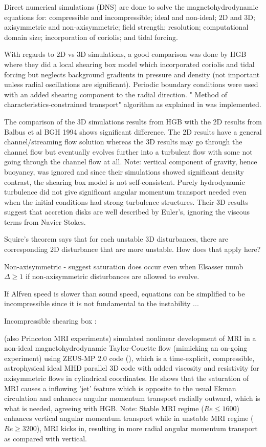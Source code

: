 \documentclass{jfm}
\begin{document}
Direct numerical simulations (DNS) are done to solve the magnetohydrodynamic 
equations for: compressible and incompressible; ideal and non-ideal; 2D and 3D;
axisymmetric and non-axisymmetric; field strength; resolution; computational 
domain size; incorporation of coriolis; and tidal forcing.

With regards to 2D vs 3D simulations, a good comparison was done by 
\cite{Hawley1995} HGB where they did a local shearing box model which 
incorporated coriolis and tidal forcing but neglects background gradients in 
pressure and density (not important unless radial oscillations are 
significant). Periodic boundary conditions were used with an added shearing 
component to the radial direction. " Method of characteristics-constrained 
transport" algorithm as explained in \cite{Hawley1995} was implemented.

The comparison of the 3D simulations results from HGB with the 2D results 
from Balbus et al BGH 1994 shows significant difference. The 2D results have
a general channel/streaming flow solution whereas the 3D results may go through
the channel flow but eventually evolves further into a turbulent flow with some
not going through the channel flow at all. Note: vertical component of gravity,
hence buoyancy, was  ignored and since their simulations showed significant 
density contrast, the shearing box model is not self-consistent. Purely 
hydrodynamic turbulence did not give significant angular momentum transport 
needed even when the initial conditions had strong turbulence structures. 
Their 3D results suggest that accretion disks are well described by Euler's, 
ignoring the viscous terms from Navier Stokes.

Squire's theorem says that for each unstable 3D disturbances, there are 
corresponding 2D disturbance that are more unstable. How does that apply here?

Non-axisymmetric \cite{Fleming2000} - suggest saturation does occur even when 
Elsasser numb $\Delta \ge 1$ if non-axisymmetric disturbances are allowed to 
evolve.

If Alfven speed is slower than sound speed, equations can be simplified to be 
incompressible since it is not fundamental to the instability \cite{Balbus1991} ...

Incompressible shearing box : \cite{Lesur2007}

\cite{Liu2008} (also Princeton MRI experiments) simulated nonlinear development
of MRI in a non-ideal magnetohydrodynamic Taylor-Couette flow (mimicking an 
on-going experiment) using ZEUS-MP 2.0 code (\cite{Hayes2006}), which is a 
time-explicit, compressible, astrophysical ideal MHD parallel 3D code with 
added viscosity and resistivity for axisymmetric flows in cylindrical 
coordinates. He shows that the saturation of MRI causes a inflowing 'jet' 
feature which is opposite to the usual Ekman circulation and enhances angular
momentum transport radially outward, which is what is needed, agreeing with 
HGB. Note: Stable MRI regime ($ Re \le 1600$) enhances vertical angular 
momentum transport while in unstable MRI regime ($Re \ge 3200$), MRI kicks in, 
resulting in more radial angular momentum transport as compared with vertical.
\end{document}
